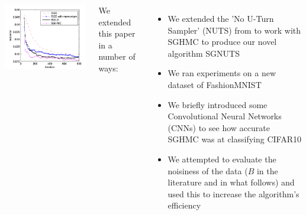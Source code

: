 \documentclass[20pt,a0paper]{tikzposter}
\begin{document}
\begin{columns}
{\begin{tikzfigure}
            \includegraphics[width=140mm]{Images/reproduce3.png}
            \end{tikzfigure}

		We extended this paper in a number of ways:
		
	\begin{itemize}
    \item We extended the 'No U-Turn Sampler' (NUTS) from \cite{nuts} to work with SGHMC to produce our novel algorithm SGNUTS
    \item We ran experiments on a new dataset of FashionMNIST
    \item We briefly introduced some Convolutional Neural Networks (CNNs) to see how accurate SGHMC was at classifying CIFAR10
    \item We attempted to evaluate the noisiness of the data ($B$ in the literature and in what follows) and used this to increase the algorithm's efficiency
\end{itemize}
		
	}
    	\end{columns}
\end{document}
